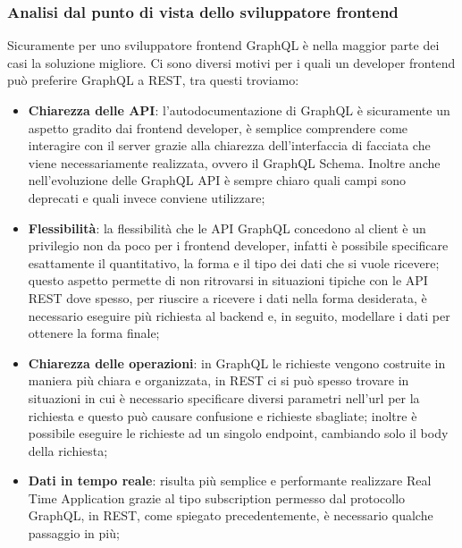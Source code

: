 \subsubsection*{Analisi dal punto di vista dello sviluppatore frontend}
Sicuramente per uno sviluppatore frontend GraphQL è nella maggior parte dei casi la soluzione migliore. Ci sono diversi motivi per i quali un developer frontend può preferire GraphQL a REST, tra questi troviamo:
\begin{itemize}
  \item \textbf{Chiarezza delle API}: l'autodocumentazione di GraphQL è sicuramente un aspetto gradito dai frontend developer, è semplice comprendere come interagire con il server grazie alla chiarezza dell'interfaccia di facciata che viene necessariamente realizzata, ovvero il GraphQL Schema. Inoltre anche nell'evoluzione delle GraphQL API è sempre chiaro quali campi sono deprecati e quali invece conviene utilizzare;
  \item \textbf{Flessibilità}: la flessibilità che le API GraphQL concedono al client è un privilegio non da poco per i frontend developer, infatti è possibile specificare esattamente il quantitativo, la forma e il tipo dei dati che si vuole ricevere; questo aspetto permette di non ritrovarsi in situazioni tipiche con le API REST dove spesso, per riuscire a ricevere i dati nella forma desiderata, è necessario eseguire più richiesta al backend e, in seguito, modellare i dati per ottenere la forma finale;
  \item \textbf{Chiarezza delle operazioni}: in GraphQL le richieste vengono costruite in maniera più chiara e organizzata, in REST ci si può spesso trovare in situazioni in cui è necessario specificare diversi parametri nell'url per la richiesta e questo può causare confusione e richieste sbagliate; inoltre è possibile eseguire le richieste ad un singolo endpoint, cambiando solo il body della richiesta;
  \item \textbf{Dati in tempo reale}: risulta più semplice e performante realizzare Real Time Application grazie al tipo subscription permesso dal protocollo GraphQL, in REST, come spiegato precedentemente, è necessario qualche passaggio in più;
\end{itemize}
